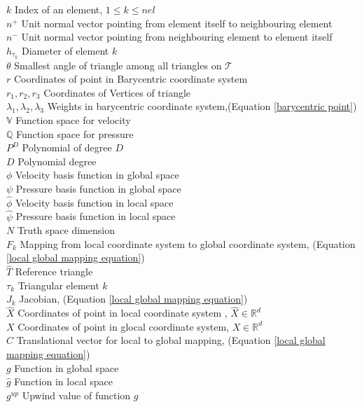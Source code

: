 \documentclass[a4paper,12pt]{book}
\begin{document}
$k$ Index of an element, $1\leq k \leq nel$\\
$n^+$ Unit normal vector pointing from element itself to neighbouring element\\
$n^-$ Unit normal vector pointing from neighbouring element to element itself\\
$h_{\tau_k}$ Diameter of element $k$\\
$\theta$ Smallest angle of triangle among all triangles on $\mathcal{T}$\\ 
$r$ Coordinates of point in Barycentric coordinate system\\
$r_1, r_2, r_3$ Coordinates of Vertices of triangle\\
$\lambda_1, \lambda_2, \lambda_3$ Weights in barycentric coordinate system,(Equation \ref{barycentric point})\\
$\mathbb{V}$ Function space for velocity\\
$\mathbb{Q}$ Function space for pressure\\
$P^D$ Polynomial of degree $D$\\
$D$ Polynomial degree\\
$\phi$ Velocity basis function in global space\\
$\psi$ Pressure basis function in global space\\
$\hat{\phi}$ Velocity basis function in local space\\
$\hat{\psi}$ Pressure basis function in local space\\
$N$ Truth space dimension\\
$F_k$ Mapping from local coordinate system to global coordinate system, (Equation \ref{local global mapping equation})\\
$\hat{T}$ Reference triangle\\
$\tau_k$ Triangular element $k$\\
$J_k$ Jacobian, (Equation \ref{local global mapping equation})\\
$\hat{X}$ Coordinates of point in local coordinate system , $\hat{X} \in \mathbb{R}^d$\\
$X$ Coordinates of point in glocal coordinate system, $X \in \mathbb{R}^d$ \\
$C$ Translational vector for local to global mapping, (Equation \ref{local global mapping equation})\\
$g$ Function in global space \\
$\hat{g}$ Function in local space \\
$g^{up}$ Upwind value of function $g$\\
\end{document}
